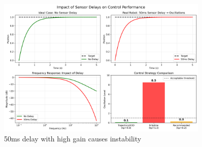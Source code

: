 \documentclass[12pt,a4paper]{article}
\begin{document}
\begin{figure}[H]
\centering
\includegraphics[width=0.9\textwidth]{sensor_delay_impact.png}
\caption{50ms delay with high gain causes instability}
\end{figure}
\end{document}
